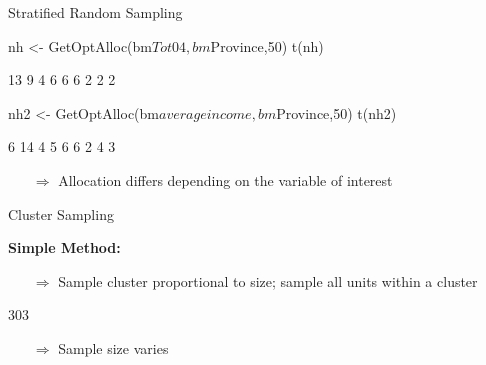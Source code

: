 \documentclass[11pt,german,hideothersubsections]{beamer}
\begin{document}
\begin{frame}[fragile]{Stratified Random Sampling}
\vspace{-.35cm}
\footnotesize{
\begin{Schunk}
\begin{Sinput}
 nh <- GetOptAlloc(bm$Tot04,bm$Province,50)
 t(nh)
\end{Sinput}
\begin{Soutput}
     [,1] [,2] [,3] [,4] [,5] [,6] [,7] [,8] [,9]
[1,]   13    9    4    6    6    6    2    2    2
\end{Soutput}
\begin{Sinput}
 nh2 <- GetOptAlloc(bm$averageincome,bm$Province,50)
 t(nh2)
\end{Sinput}
\begin{Soutput}
     [,1] [,2] [,3] [,4] [,5] [,6] [,7] [,8] [,9]
[1,]    6   14    4    5    6    6    2    4    3
\end{Soutput}
\end{Schunk}
\begin{itemize}
\pause\item[$\Rightarrow$] Allocation differs depending on the variable of interest
\end{itemize}
}
\end{frame}
\begin{frame}[fragile]{Cluster Sampling}
\vspace{-.35cm}
\footnotesize{
\begin{center}
\textbf{Simple Method:}
\end{center}
\begin{itemize}
\item[$\Rightarrow$] Sample cluster proportional to size; sample all units within a cluster
\end{itemize}
\begin{Schunk}
\begin{Soutput}
[1] 303
\end{Soutput}
\end{Schunk}

\begin{itemize}
\pause\item[$\Rightarrow$] Sample size varies
\end{itemize}
}
\end{frame}
\end{document}
